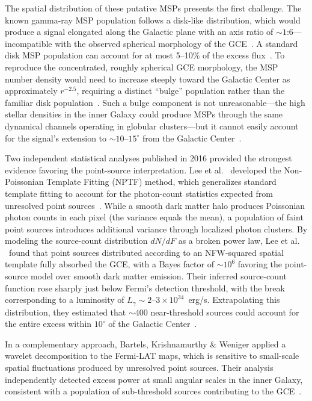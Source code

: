 The spatial distribution of these putative MSPs presents the first challenge.
The known gamma-ray MSP population follows a disk-like distribution, which would produce a signal elongated along the Galactic plane with an axis ratio of $\sim 1$:$6$---incompatible with the observed spherical morphology of the GCE~\cite{Daylan:2014rsa}.
A standard disk MSP population can account for at most 5--10\% of the excess flux~\cite{Calore:2014xka}.
To reproduce the concentrated, roughly spherical GCE morphology, the MSP number density would need to increase steeply toward the Galactic Center as approximately $r^{-2.5}$, requiring a distinct ``bulge'' population rather than the familiar disk population~\cite{Calore:2014xka}.
Such a bulge component is not unreasonable---the high stellar densities in the inner Galaxy could produce MSPs through the same dynamical channels operating in globular clusters---but it cannot easily account for the signal's extension to $\sim 10$--$15^\circ$ from the Galactic Center~\cite{Calore:2014xka}.

Two independent statistical analyses published in 2016 provided the strongest evidence favoring the point-source interpretation.
Lee et al.
\ developed the Non-Poissonian Template Fitting (NPTF) method, which generalizes standard template fitting to account for the photon-count statistics expected from unresolved point sources~\cite{Lee:2015fea}.
While a smooth dark matter halo produces Poissonian photon counts in each pixel (the variance equals the mean), a population of faint point sources introduces additional variance through localized photon clusters.
By modeling the source-count distribution $dN/dF$ as a broken power law, Lee et al.
\ found that point sources distributed according to an NFW-squared spatial template fully absorbed the GCE, with a Bayes factor of $\sim 10^6$ favoring the point-source model over smooth dark matter emission.
Their inferred source-count function rose sharply just below Fermi's detection threshold, with the break corresponding to a luminosity of $L_\gamma \sim 2$--$3 \times 10^{34}$~erg/s.
Extrapolating this distribution, they estimated that $\sim 400$ near-threshold sources could account for the entire excess within $10^\circ$ of the Galactic Center~\cite{Lee:2015fea}.

In a complementary approach, Bartels, Krishnamurthy \& Weniger applied a wavelet decomposition to the Fermi-LAT maps, which is sensitive to small-scale spatial fluctuations produced by unresolved point sources.
Their analysis independently detected excess power at small angular scales in the inner Galaxy, consistent with a population of sub-threshold sources contributing to the GCE~\cite{Bartels:2015aea}.

